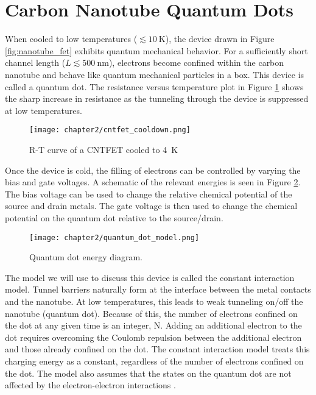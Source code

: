 \section{Carbon Nanotube Quantum Dots}

When cooled to low temperatures ($\lesssim \SI{10}{\kelvin}$), the device drawn in Figure \ref{fig:nanotube_fet} exhibits quantum mechanical behavior. For a sufficiently short channel length ($L \lesssim \SI{500}{\nano\meter}$), electrons become confined within the carbon nanotube and behave like quantum mechanical particles in a box. This device is called a quantum dot. The resistance versus temperature plot in Figure \ref{fig:CNT_RT} shows the sharp increase in resistance as the tunneling through the device is suppressed at low temperatures. 

\begin{figure}
    \centering
    \texttt{[image: chapter2/cntfet\_cooldown.png]}
    \caption{R-T curve of a CNTFET cooled to \SI{4}{\kelvin}}
    \label{fig:CNT_RT}
\end{figure}

Once the device is cold, the filling of electrons can be controlled by varying the bias and gate voltages. A schematic of the relevant energies is seen in Figure \ref{fig:QD_model}. The bias voltage can be used to change the relative chemical potential of the source and drain metals. The gate voltage is then used to change the chemical potential on the quantum dot relative to the source/drain.

\begin{figure}
    \centering
    \texttt{[image: chapter2/quantum\_dot\_model.png]}
    \caption{Quantum dot energy diagram.}
    \label{fig:QD_model}
\end{figure}

The model we will use to discuss this device is called the constant interaction model. Tunnel barriers naturally form at the interface between the metal contacts and the nanotube. At low temperatures, this leads to weak tunneling on/off the nanotube (quantum dot). Because of this, the number of electrons confined on the dot at any given time is an integer, N. Adding an additional electron to the dot requires overcoming the Coulomb repulsion between the additional electron and those already confined on the dot. The constant interaction model treats this charging energy as a constant, regardless of the number of electrons confined on the dot. The model also assumes that the states on the quantum dot are not affected by the electron-electron interactions \cite{Kouwenhoven2001}.

